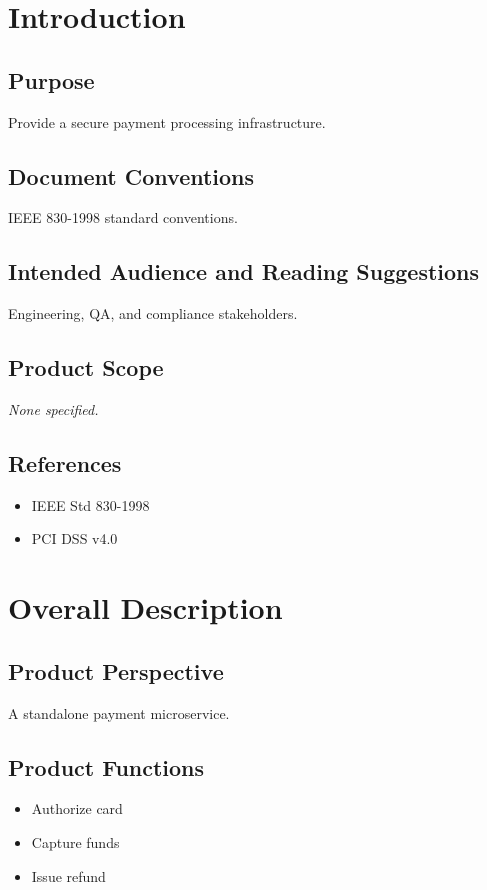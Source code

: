 \documentclass[11pt,a4paper]{article}
\begin{document}
\section{Introduction}
\subsection{Purpose}
Provide a secure payment processing infrastructure.

\subsection{Document Conventions}
IEEE 830-1998 standard conventions.

\subsection{Intended Audience and Reading Suggestions}
Engineering, QA, and compliance stakeholders.

\subsection{Product Scope}
\textit{None specified.}\par\vspace{6pt}

\subsection{References}
\begin{itemize}[leftmargin=*]
    \item IEEE Std 830-1998
    \item PCI DSS v4.0
\end{itemize}

\section{Overall Description}
\subsection{Product Perspective}
A standalone payment microservice.

\subsection{Product Functions}
\begin{itemize}[leftmargin=*]
    \item Authorize card
    \item Capture funds
    \item Issue refund
\end{itemize}
\end{document}
